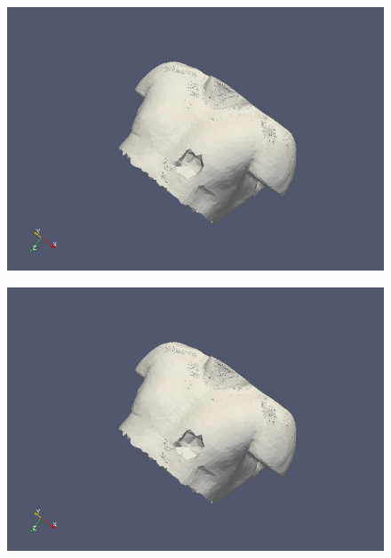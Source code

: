 \documentclass[xcolor={usenames,dvipsnames,svgnames,table}]{beamer}
\begin{document}
\begin{frame}
\begin{center}
        \begin{minipage}[h]{0.47\textwidth}
            \begin{figure}[h]
                \includegraphics[width=\textwidth]{png/corpse/image3.png}
            \end{figure}
        \end{minipage}
        \begin{minipage}[h]{0.47\textwidth}
            \begin{figure}[h]
                \includegraphics[width=\textwidth]{png/corpse/image4.png}
            \end{figure}
        \end{minipage}
    \end{center}
\end{frame}
\end{document}
